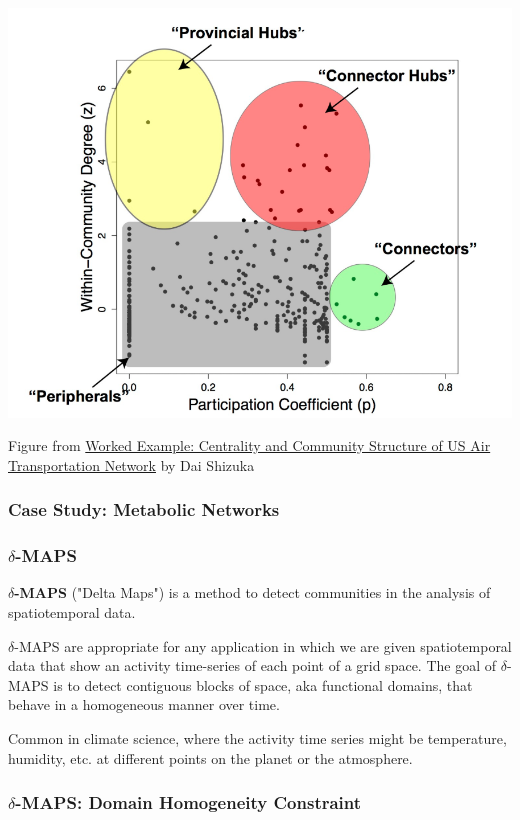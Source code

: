 \documentclass[11pt]{scrartcl} %
\begin{document}
\begin{center}
\includegraphics[width=0.75\linewidth]{img/L8.2-WithinModuleDegree.PNG}

{\tiny Figure from \href{https://dshizuka.github.io/networkanalysis/example_usairports.html}{Worked Example: Centrality and Community Structure of US Air Transportation Network} by Dai Shizuka}
\end{center}

\subsubsection{Case Study: Metabolic Networks}
\subsubsection{$\delta$-MAPS}
\textbf{$\delta$-MAPS} ("Delta Maps") is a method to detect communities in the analysis of spatiotemporal data. 

$\delta$-MAPS are appropriate for any application in which we are given spatiotemporal data that show an activity time-series of each point of a grid space. The goal of $\delta$-MAPS is to detect contiguous blocks of space, aka functional domains, that behave in a homogeneous manner over time. 

Common in climate science, where the activity time series might be temperature, humidity, etc. at different points on the planet or the atmosphere. 


\subsubsection{$\delta$-MAPS: Domain Homogeneity Constraint}
\end{document}
